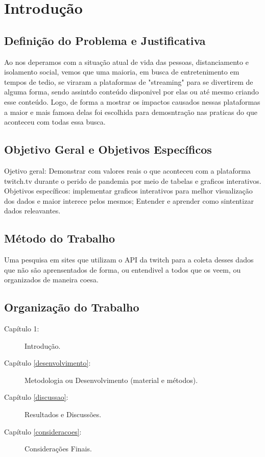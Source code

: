 \chapter{Introdução} \label{Introducao}
\section{Definição do Problema e Justificativa}
Ao nos deperamos com a situação atual de vida das pessoas, distanciamento e isolamento social, vemos que uma maioria, em busca de entretenimento em tempos de tedio, se viraram a plataformas de "streaming" para se divertirem de alguma forma, sendo assintdo conteúdo disponivel por elas ou até mesmo criando esse conteúdo. Logo, de forma a mostrar os impactos causados nessas plataformas a maior e mais famosa delas foi escolhida para demosntração nas praticas do que aconteceu com todas essa busca. 

\section{Objetivo Geral e Objetivos Específicos}
Ojetivo geral: Demonstrar com valores reais o que aconteceu com a plataforma twitch.tv durante o perido de pandemia por meio de tabelas e graficos interativos.
Objetivos específicos: 
    implementar graficos interativos para melhor visualização dos dados e maior interece
    pelos mesmos;
    Entender e aprender como sintentizar dados releavantes.


\section{Método do Trabalho}
Uma pesquisa em sites que utilizam o API da twitch para a coleta desses dados que não são aprensentados de forma, ou entendivel a todos que os veem, ou organizados de maneira coesa.

\section{Organização do Trabalho}
\begin{description}
   \item[Capítulo 1:] Introdução.
   \item[Capítulo \ref{desenvolvimento}:] Metodologia ou Desenvolvimento (material e métodos).
   \item[Capítulo \ref{discussao}:] Resultados e Discussões.
   \item[Capítulo \ref{consideracoes}:] Considerações Finais.
\end{description}


 









